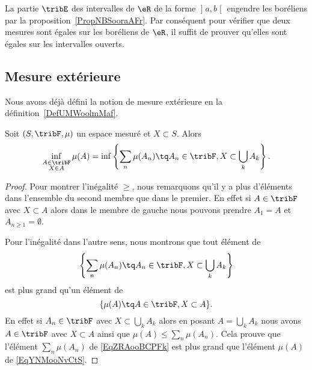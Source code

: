 \begin{example}\label{ExDMPoohtNAj}
	La partie \( \tribE\) des intervalles de \( \eR\) de la forme \( \mathopen] a , b \mathclose[\) engendre les boréliens par la proposition~\ref{PropNBSooraAFr}. Par conséquent pour vérifier que deux mesures sont égales sur les boréliens de \( \eR\), il suffit de prouver qu'elles sont égales sur les intervalles ouverts.
\end{example}

\subsection{Mesure extérieure}

Nous avons déjà défini la notion de mesure extérieure en la définition~\ref{DefUMWoolmMaf}.

\begin{lemma}  \label{LemULSooBgZLI}
	Soit \( (S,\tribF,\mu)\) un espace mesuré et \( X\subset S\). Alors
	\begin{equation}
		\inf_{\substack{A\in\tribF\\X\in A}}\mu(A) = \inf\left\{ \sum_n\mu(A_n) \tq A_n\in\tribF,X\subset\bigcup_kA_k \right\}.
	\end{equation}
\end{lemma}

\begin{proof}
	Pour montrer l'inégalité \( \geq\), nous remarquons qu'il y a plus d'éléments dans l'ensemble du second membre que dans le premier. En effet si \( A\in\tribF\) avec \( X\subset A\) alors dans le membre de gauche nous pouvons prendre \( A_1=A\) et \( A_{n\geq 1}=\emptyset\).

	Pour l'inégalité dans l'autre sens, nous montrons que tout élément de
	\begin{equation}    \label{EqZRAooBCPFk}
		\left\{ \sum_n\mu(A_n) \tq A_n\in\tribF,X\subset\bigcup_kA_k \right\}
	\end{equation}
	est plus grand qu'un élément de
	\begin{equation}    \label{EqYNMooNvCtS}
		\{ \mu(A)\tq A\in\tribF,X\subset A \}.
	\end{equation}
	En effet si \( A_n\in\tribF\) avec \( X\subset \bigcup_kA_k\) alors en posant \( A=\bigcup_kA_k\) nous avons \( A\in\tribF\) avec \( X\subset A\) ainsi que \( \mu(A)\leq\sum_n\mu(A_n)\). Cela prouve que l'élément \( \sum_n\mu(A_n)\) de \eqref{EqZRAooBCPFk} est plus grand que l'élément \( \mu(A)\) de \eqref{EqYNMooNvCtS}.
\end{proof}

